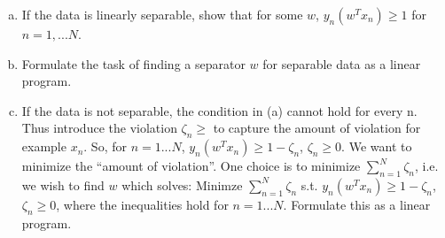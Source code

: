 \documentclass[a4paper,10pt]{article}
\begin{document}
\begin{enumerate}[a)]
\item If the data is linearly separable, show that for some $w$, $y_n(w^T x_n)\geq 1$ for $n = 1, ... N$.
\item Formulate the task of finding a separator $w$ for separable data as a linear program.
\item If the data is not separable, the condition in (a) cannot hold for every n. Thus introduce the violation $\zeta_n \geq$ to capture the amount of violation for example $x_n$. So, for $n=1... N$, $y_n(w^T x_n) \geq 1-\zeta_n$, $\zeta_n \geq 0$.
We want to minimize the ``amount of violation''. One choice is to minimize $\sum_{n=1}^N \zeta_n$, i.e. we wish to find $w$ which solves: Minimze $\sum_{n=1}^N \zeta_n$ s.t. $y_n(w^T x_n) \geq 1 - \zeta_n$, $\zeta_n \geq 0$, where the inequalities hold for $n=1...N$. Formulate this as a linear program.
\end{enumerate}
\end{document}
